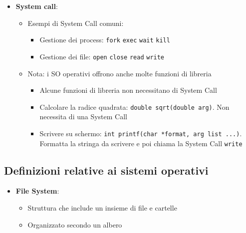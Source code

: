 \documentclass[]{article}
\providecommand{\tightlist}{%
  \setlength{\itemsep}{0pt}\setlength{\parskip}{0pt}}
\begin{document}
\begin{itemize}
\tightlist
\item
  \textbf{System call}:

  \begin{itemize}
  \tightlist
  \item
    Esempi di System Call comuni:

    \begin{itemize}
    \tightlist
    \item
      Gestione dei process: \texttt{fork} \texttt{exec} \texttt{wait}
      \texttt{kill}
    \item
      Gestione dei file: \texttt{open} \texttt{close} \texttt{read}
      \texttt{write}
    \end{itemize}
  \item
    Nota: i SO operativi offrono anche molte funzioni di libreria

    \begin{itemize}
    \tightlist
    \item
      Alcune funzioni di libreria non necessitano di System Call
    \item
      Calcolare la radice quadrata: \texttt{double\ sqrt(double\ arg)}.
      Non necessita di una System Call
    \item
      Scrivere su schermo:
      \texttt{int\ printf(char\ *format,\ arg\ list\ ...)}. Formatta la
      stringa da scrivere e poi chiama la System Call \texttt{write}
    \end{itemize}
  \end{itemize}
\end{itemize}

\hypertarget{definizioni-relative-ai-sistemi-operativi-3}{%
\subsection{Definizioni relative ai sistemi
operativi}\label{definizioni-relative-ai-sistemi-operativi-3}}

\begin{itemize}
\tightlist
\item
  \textbf{File System}:

  \begin{itemize}
  \tightlist
  \item
    Struttura che include un insieme di file e cartelle
  \item
    Organizzato secondo un albero
  \end{itemize}
\end{itemize}
\end{document}
